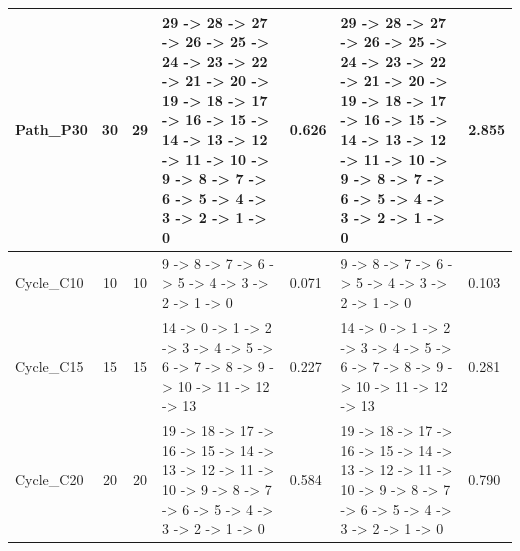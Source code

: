 \documentclass[8pt]{article}
\begin{document}
\begin{longtable}{@{}L{3.2cm} c c L{4cm} L{1.2cm} L{4cm} L{1.2cm}@{}}
\midrule
Path\_P30 & 30 & 29 & 29 -\textgreater{} 28 -\textgreater{} 27 -\textgreater{} 26 -\textgreater{} 25 -\textgreater{} 24 -\textgreater{} 23 -\textgreater{} 22 -\textgreater{} 21 -\textgreater{} 20 -\textgreater{} 19 -\textgreater{} 18 -\textgreater{} 17 -\textgreater{} 16 -\textgreater{} 15 -\textgreater{} 14 -\textgreater{} 13 -\textgreater{} 12 -\textgreater{} 11 -\textgreater{} 10 -\textgreater{} 9 -\textgreater{} 8 -\textgreater{} 7 -\textgreater{} 6 -\textgreater{} 5 -\textgreater{} 4 -\textgreater{} 3 -\textgreater{} 2 -\textgreater{} 1 -\textgreater{} 0 & 0.626 & 29 -\textgreater{} 28 -\textgreater{} 27 -\textgreater{} 26 -\textgreater{} 25 -\textgreater{} 24 -\textgreater{} 23 -\textgreater{} 22 -\textgreater{} 21 -\textgreater{} 20 -\textgreater{} 19 -\textgreater{} 18 -\textgreater{} 17 -\textgreater{} 16 -\textgreater{} 15 -\textgreater{} 14 -\textgreater{} 13 -\textgreater{} 12 -\textgreater{} 11 -\textgreater{} 10 -\textgreater{} 9 -\textgreater{} 8 -\textgreater{} 7 -\textgreater{} 6 -\textgreater{} 5 -\textgreater{} 4 -\textgreater{} 3 -\textgreater{} 2 -\textgreater{} 1 -\textgreater{} 0 & 2.855 \\
\midrule
Cycle\_C10 & 10 & 10 & 9 -\textgreater{} 8 -\textgreater{} 7 -\textgreater{} 6 -\textgreater{} 5 -\textgreater{} 4 -\textgreater{} 3 -\textgreater{} 2 -\textgreater{} 1 -\textgreater{} 0 & 0.071 & 9 -\textgreater{} 8 -\textgreater{} 7 -\textgreater{} 6 -\textgreater{} 5 -\textgreater{} 4 -\textgreater{} 3 -\textgreater{} 2 -\textgreater{} 1 -\textgreater{} 0 & 0.103 \\
\midrule
Cycle\_C15 & 15 & 15 & 14 -\textgreater{} 0 -\textgreater{} 1 -\textgreater{} 2 -\textgreater{} 3 -\textgreater{} 4 -\textgreater{} 5 -\textgreater{} 6 -\textgreater{} 7 -\textgreater{} 8 -\textgreater{} 9 -\textgreater{} 10 -\textgreater{} 11 -\textgreater{} 12 -\textgreater{} 13 & 0.227 & 14 -\textgreater{} 0 -\textgreater{} 1 -\textgreater{} 2 -\textgreater{} 3 -\textgreater{} 4 -\textgreater{} 5 -\textgreater{} 6 -\textgreater{} 7 -\textgreater{} 8 -\textgreater{} 9 -\textgreater{} 10 -\textgreater{} 11 -\textgreater{} 12 -\textgreater{} 13 & 0.281 \\
\midrule
Cycle\_C20 & 20 & 20 & 19 -\textgreater{} 18 -\textgreater{} 17 -\textgreater{} 16 -\textgreater{} 15 -\textgreater{} 14 -\textgreater{} 13 -\textgreater{} 12 -\textgreater{} 11 -\textgreater{} 10 -\textgreater{} 9 -\textgreater{} 8 -\textgreater{} 7 -\textgreater{} 6 -\textgreater{} 5 -\textgreater{} 4 -\textgreater{} 3 -\textgreater{} 2 -\textgreater{} 1 -\textgreater{} 0 & 0.584 & 19 -\textgreater{} 18 -\textgreater{} 17 -\textgreater{} 16 -\textgreater{} 15 -\textgreater{} 14 -\textgreater{} 13 -\textgreater{} 12 -\textgreater{} 11 -\textgreater{} 10 -\textgreater{} 9 -\textgreater{} 8 -\textgreater{} 7 -\textgreater{} 6 -\textgreater{} 5 -\textgreater{} 4 -\textgreater{} 3 -\textgreater{} 2 -\textgreater{} 1 -\textgreater{} 0 & 0.790 \\

\end{longtable}
\end{document}
